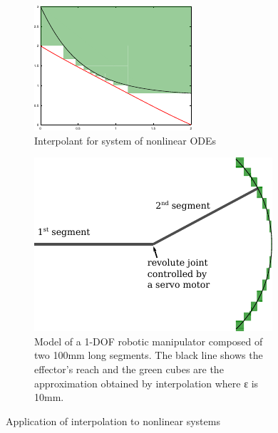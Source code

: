 \begin{figure}
\begin{subfigure}{0.45\textwidth}
  \centering
  \includegraphics[scale=1.5]{img/ode.pdf}
  \caption{ Interpolant for system of nonlinear ODEs } %
  \label{fig:ode}
\end{subfigure}
\hfill
\begin{subfigure}{0.5\textwidth}
  \centering
  \includegraphics[scale=1]{img/arm.pdf}
  \caption{
    Model of a 1-DOF robotic manipulator composed of two 100mm long segments.
    The black line shows the effector's reach and the green cubes are the approximation obtained by interpolation where ε is 10mm.
  }
  \label{fig:robot}
\end{subfigure}
\caption{Application of interpolation to nonlinear systems}
\end{figure}


